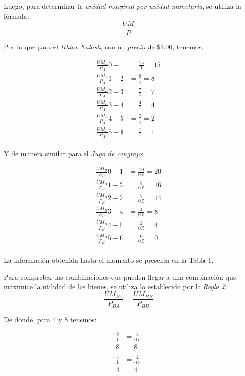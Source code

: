 \documentclass[a4paper,12pt]{article}
\begin{document}
Luego, para determinar la \textit{unidad marginal por unidad monetaria}, se utiliza la fórmula:\\

\[
	\frac{UM}{P}
\]

Por lo que para el \emph{Khlav Kalash}, con un \emph{precio} de \$1.00, tenemos:

\begin{align*}
	\frac{UM_A}{P_A}0-1 &= \frac{15}{1} = 15 \\
	\frac{UM_A}{P_A}1-2 &= \frac{8}{1} = 8 \\
	\frac{UM_A}{P_A}2-3 &= \frac{7}{1} = 7 \\
	\frac{UM_A}{P_A}3-4 &= \frac{4}{1} = 4 \\
	\frac{UM_A}{P_A}4-5 &= \frac{2}{1} = 2 \\
	\frac{UM_A}{P_A}5-6 &= \frac{1}{1} = 1 \\
\end{align*}

Y de manera similar para el \emph{Jugo de cangrejo}:

\begin{align*}
	\frac{UM_B}{P_B}0-1 &= \frac{10}{0.5} = 20 \\
	\frac{UM_B}{P_B}1-2 &= \frac{8}{0.5} = 16 \\
	\frac{UM_B}{P_B}2-3 &= \frac{7}{0.5} = 14 \\
	\frac{UM_B}{P_B}3-4 &= \frac{4}{0.5} = 8 \\
	\frac{UM_B}{P_B}4-5 &= \frac{2}{0.5} = 4 \\
	\frac{UM_B}{P_B}5-6 &= \frac{0}{0.5} = 0 \\
\end{align*}

La información obtenida hasta el momento se presenta en la Tabla 1.

\vspace{1cm}

Para comprobar las combinaciones que pueden llegar a una combinación que maximice la utilidad de los bienes, se utiliza lo establecido por la \emph{Regla 2}:
\[
	\frac{UM_{BA}}{P_{BA}} = \frac{UM_{BB}}{P_{BB}}
\]

De donde, para 4 y 8 tenemos:

\begin{align*}
	\frac{8}{1} &= \frac{4}{0.5} \\
	8 &= 8 \\ \\
	\frac{4}{1} &= \frac{2}{0.5} \\
	4 &= 4 \\ 
\end{align*}
\end{document}
